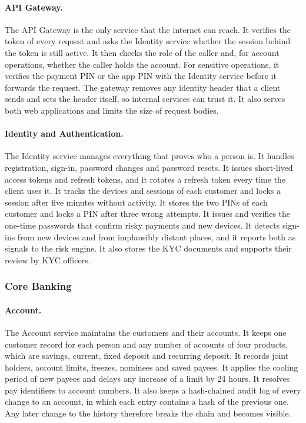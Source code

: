 \documentclass[11pt,a4paper]{article}
\begin{document}
\paragraph{API Gateway.} The API Gateway is the only service that the internet can reach. It verifies the token of every request and asks the Identity service whether the session behind the token is still active. It then checks the role of the caller and, for account operations, whether the caller holds the account. For sensitive operations, it verifies the payment PIN or the app PIN with the Identity service before it forwards the request. The gateway removes any identity header that a client sends and sets the header itself, so internal services can trust it. It also serves both web applications and limits the size of request bodies.

\paragraph{Identity and Authentication.} The Identity service manages everything that proves who a person is. It handles registration, sign-in, password changes and password resets. It issues short-lived access tokens and refresh tokens, and it rotates a refresh token every time the client uses it. It tracks the devices and sessions of each customer and locks a session after five minutes without activity. It stores the two PINs of each customer and locks a PIN after three wrong attempts. It issues and verifies the one-time passwords that confirm risky payments and new devices. It detects sign-ins from new devices and from implausibly distant places, and it reports both as signals to the risk engine. It also stores the KYC documents and supports their review by KYC officers.

\subsubsection{Core Banking}

\paragraph{Account.} The Account service maintains the customers and their accounts. It keeps one customer record for each person and any number of accounts of four products, which are savings, current, fixed deposit and recurring deposit. It records joint holders, account limits, freezes, nominees and saved payees. It applies the cooling period of new payees and delays any increase of a limit by 24 hours. It resolves pay identifiers to account numbers. It also keeps a hash-chained audit log of every change to an account, in which each entry contains a hash of the previous one. Any later change to the history therefore breaks the chain and becomes visible.
\end{document}
